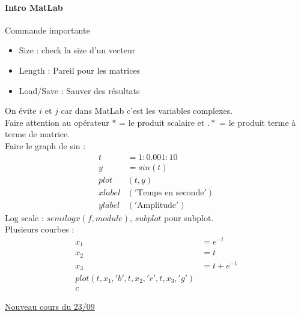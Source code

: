 \documentclass{article}
\theoremstyle{plain}%
\theoremstyle{definition}
\theoremstyle{remark}
\begin{document}
\paragraph*{Intro MatLab}
Commande importante \begin{itemize}
    \item Size : check la size d'un vecteur 
    \item Length : Pareil pour les matrices
    \item Load/Save : Sauver des résultats
\end{itemize}
On évite $ i $ et $ j $ car dans MatLab c'est les variables complexes.\\
Faire attention au opérateur $ * $ = le produit scalaire et $ .* $  = le produit terme à terme de matrice.\\
Faire le graph de sin : \begin{align*}
    t &= 1:0.001:10 \\
    y &= sin(t) \\
    plot&(t,y) \\
    xlabel&('\text{Temps en seconde}') \\
    ylabel&('\text{Amplitude}')
\end{align*}
Log scale : $ semilogx(f, module) $, $ subplot $ pour subplot. \\
Plusieurs courbes : \begin{align*}
    x_1 &= e^{-t} \\
    x_2 &= t \\
    x_3 &= t + e^{-t} \\
    plot(t,x_1,'b', t,x_2,'r', t,x_3, 'g') \\
    c
\end{align*}



\underline{Nouveau cours du 23/09} \\
\end{document}
